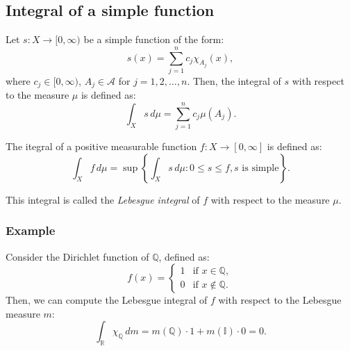 \documentclass[11pt]{article}
\begin{document}
\subsection{Integral of a simple function}
Let \(s: X \to [0, \infty)\) be a simple function of the form:
\[s(x) = \sum_{j=1}^{n} c_j \chi_{A_j}(x),\]
where \(c_j \in [0, \infty)\), \(A_j \in \mathcal{A}\) for \(j = 1, 2, \ldots, n\). Then, the integral of \(s\) with respect to the measure \(\mu\) is defined as:
\[\int_X s \,d\mu = \sum_{j=1}^{n} c_j \mu(A_j).\]

The itegral of a positive measurable function \(f: X \to [0, \infty]\) is defined as:
\[\int_X f \,d\mu = \sup\left\{\int_X s \,d\mu : 0 \leq s \leq f, s \text{ is simple}\right\}.\]

This integral is called the \textit{Lebesgue integral} of \(f\) with respect to the measure \(\mu\).

\subsubsection*{Example}
Consider the Dirichlet function of \(\mathbb{Q}\), defined as:
\[f(x) = \begin{cases}
    1 & \text{if } x \in \mathbb{Q}, \\
    0 & \text{if } x \notin \mathbb{Q}.
\end{cases}\]
Then, we can compute the Lebesgue integral of \(f\) with respect to the Lebesgue measure \(m\):
\[\int_{\mathbb{R}} \chi_{\mathbb{Q}} \,dm = m(\mathbb{Q})\cdot 1 + m(\mathbb{I}) \cdot 0 = 0.\]
\end{document}

